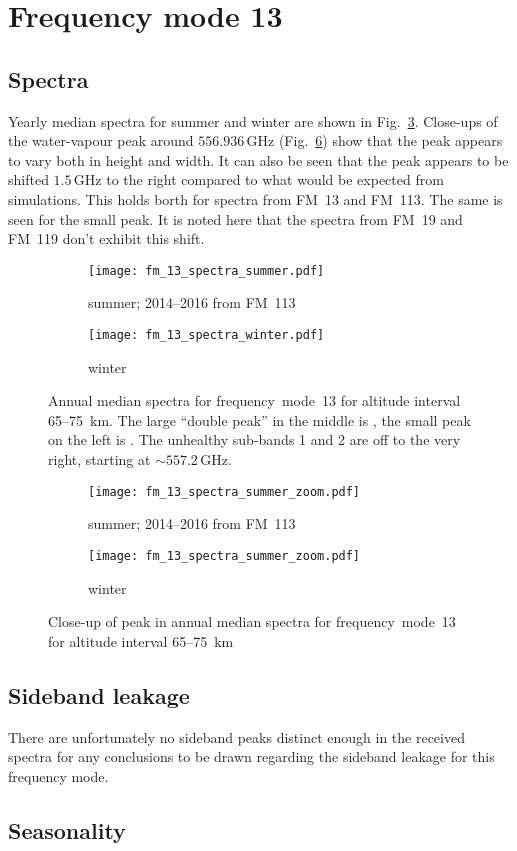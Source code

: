 \section{Frequency mode 13}
\label{FM13}
\subsection{Spectra}
\label{FM13:spectra}
Yearly median spectra for summer and winter are shown in
Fig.~\ref{fig:spectra:13}. Close-ups of the water-vapour peak around
$556.936\,\mathrm{GHz}$ (Fig.~\ref{fig:spectra:13:closeup}) show that the peak
appears to vary both in height and width. It can also be seen that the peak
appears to be shifted $1.5\,\mathrm{GHz}$ to the right compared to what would
be expected from simulations. This holds borth for spectra from FM~13 and
FM~113. The same is seen for the small  peak. It is noted here that the spectra from FM~19 and FM~119 don't
exhibit this shift.


\begin{figure}[h]
    \centering
    \begin{subfigure}[b]{0.9545\textwidth}
        \texttt{[image: fm\_13\_spectra\_summer.pdf]}
        \caption{summer; 2014--2016 from FM~113}\label{fig:spectra:13:summer}
    \end{subfigure}
    \begin{subfigure}[b]{0.9545\textwidth}
        \texttt{[image: fm\_13\_spectra\_winter.pdf]}
        \caption{winter}\label{fig:spectra:13:winter}
    \end{subfigure}
    \caption{Annual median spectra for frequency~mode~13 for altitude
        interval 65--75~km. The large ``double peak'' in the middle is
        , the small peak on the left is . The
        unhealthy sub-bands 1 and 2 are off to the very right, starting at
        $\sim557.2\,\mathrm{GHz}$.}\label{fig:spectra:13}
\end{figure}

\begin{figure}[h]
    \centering
    \begin{subfigure}[b]{0.9545\textwidth}
        \texttt{[image: fm\_13\_spectra\_summer\_zoom.pdf]}
        \caption{summer; 2014--2016 from
            FM~113}\label{fig:spectra:13:summer:closeup}
    \end{subfigure}
    \begin{subfigure}[b]{0.9545\textwidth}
        \texttt{[image: fm\_13\_spectra\_summer\_zoom.pdf]}
        \caption{winter}\label{fig:spectra:13:winter:closeup}
    \end{subfigure}
    \caption{Close-up of  peak in annual median spectra for
        frequency~mode~13 for altitude interval
        65--75~km}\label{fig:spectra:13:closeup}
\end{figure}

\subsection{Sideband leakage}
\label{FM13:sbl}
There are unfortunately no sideband peaks distinct enough in the received
spectra for any conclusions to be drawn regarding the sideband leakage for
this frequency mode.

\subsection{Seasonality}
